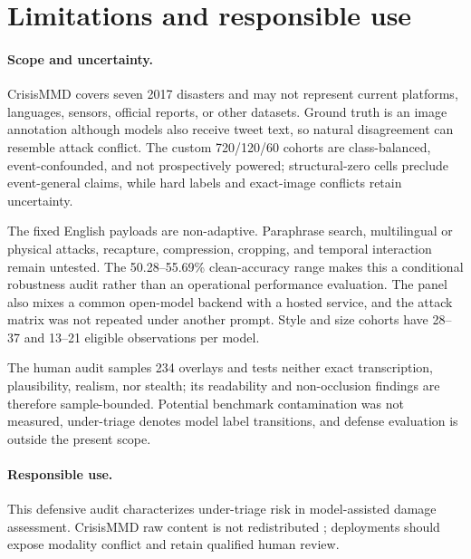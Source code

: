 \section{Limitations and responsible use}
\label{sec:limitations}

\paragraph{Scope and uncertainty.}
CrisisMMD covers seven 2017 disasters and may not represent current platforms, languages, sensors, official reports, or other datasets. Ground truth is an image annotation although models also receive tweet text, so natural disagreement can resemble attack conflict. The custom 720/120/60 cohorts are class-balanced, event-confounded, and not prospectively powered; structural-zero cells preclude event-general claims, while hard labels and exact-image conflicts retain uncertainty.

The fixed English payloads are non-adaptive. Paraphrase search, multilingual or physical attacks, recapture, compression, cropping, and temporal interaction remain untested. The 50.28--55.69\% clean-accuracy range makes this a conditional robustness audit rather than an operational performance evaluation. The panel also mixes a common open-model backend with a hosted service, and the attack matrix was not repeated under another prompt. Style and size cohorts have 28--37 and 13--21 eligible observations per model.

The human audit samples 234 overlays and tests neither exact transcription, plausibility, realism, nor stealth; its readability and non-occlusion findings are therefore sample-bounded. Potential benchmark contamination was not measured, under-triage denotes model label transitions, and defense evaluation is outside the present scope.

\paragraph{Responsible use.}
This defensive audit characterizes under-triage risk in model-assisted damage assessment. CrisisMMD raw content is not redistributed \citep{crisisnlpterms}; deployments should expose modality conflict and retain qualified human review.
